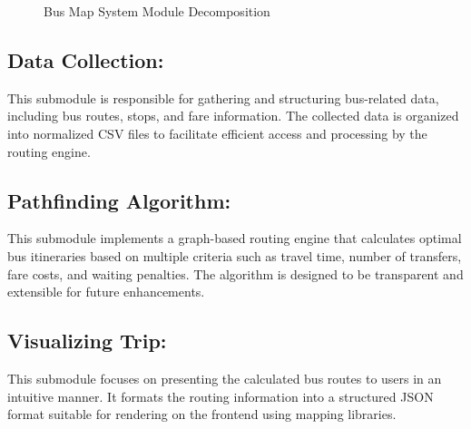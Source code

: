 \begin{figure}[H]
    \centering
    \caption{Bus Map System Module Decomposition}
    \label{fig:busmap-overview}
\end{figure}

\subsection{Data Collection:} This submodule is responsible for gathering and structuring bus-related data, including bus routes, stops, and fare information. The collected data is organized into normalized CSV files to facilitate efficient access and processing by the routing engine.

\subsection{Pathfinding Algorithm:} This submodule implements a graph-based routing engine that calculates optimal bus itineraries based on multiple criteria such as travel time, number of transfers, fare costs, and waiting penalties. The algorithm is designed to be transparent and extensible for future enhancements.

\subsection{Visualizing Trip:} This submodule focuses on presenting the calculated bus routes to users in an intuitive manner. It formats the routing information into a structured JSON format suitable for rendering on the frontend using mapping libraries.

